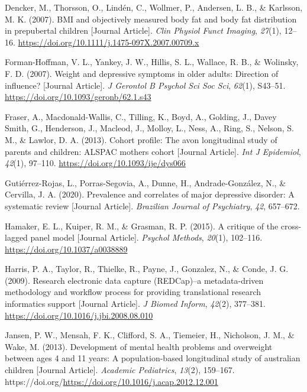 \documentclass[
  letterpaper,
  DIV=11,
  numbers=noendperiod]{scrreport}
\newlength{\cslhangindent}
\newenvironment{CSLReferences}[2] %
 {\begin{list}{}{%
  \setlength{\itemindent}{0pt}
  \setlength{\leftmargin}{0pt}
  \setlength{\parsep}{0pt}
  \ifodd #1
   \setlength{\leftmargin}{\cslhangindent}
   \setlength{\itemindent}{-1\cslhangindent}
  \fi
  \setlength{\itemsep}{#2\baselineskip}}}
 {\end{list}}
\begin{document}
\begin{CSLReferences}{1}{0}
Dencker, M., Thorsson, O., Lindén, C., Wollmer, P., Andersen, L. B., \&
Karlsson, M. K. (2007). BMI and objectively measured body fat and body
fat distribution in prepubertal children {[}Journal Article{]}.
\emph{Clin Physiol Funct Imaging}, \emph{27}(1), 12--16.
\url{https://doi.org/10.1111/j.1475-097X.2007.00709.x}

Forman-Hoffman, V. L., Yankey, J. W., Hillis, S. L., Wallace, R. B., \&
Wolinsky, F. D. (2007). Weight and depressive symptoms in older adults:
Direction of influence? {[}Journal Article{]}. \emph{J Gerontol B
Psychol Sci Soc Sci}, \emph{62}(1), S43--51.
\url{https://doi.org/10.1093/geronb/62.1.s43}

Fraser, A., Macdonald-Wallis, C., Tilling, K., Boyd, A., Golding, J.,
Davey Smith, G., Henderson, J., Macleod, J., Molloy, L., Ness, A., Ring,
S., Nelson, S. M., \& Lawlor, D. A. (2013). Cohort profile: The avon
longitudinal study of parents and children: ALSPAC mothers cohort
{[}Journal Article{]}. \emph{Int J Epidemiol}, \emph{42}(1), 97--110.
\url{https://doi.org/10.1093/ije/dys066}

Gutiérrez-Rojas, L., Porras-Segovia, A., Dunne, H., Andrade-González,
N., \& Cervilla, J. A. (2020). Prevalence and correlates of major
depressive disorder: A systematic review {[}Journal Article{]}.
\emph{Brazilian Journal of Psychiatry}, \emph{42}, 657--672.

Hamaker, E. L., Kuiper, R. M., \& Grasman, R. P. (2015). A critique of
the cross-lagged panel model {[}Journal Article{]}. \emph{Psychol
Methods}, \emph{20}(1), 102--116. \url{https://doi.org/10.1037/a0038889}

Harris, P. A., Taylor, R., Thielke, R., Payne, J., Gonzalez, N., \&
Conde, J. G. (2009). Research electronic data capture (REDCap)--a
metadata-driven methodology and workflow process for providing
translational research informatics support {[}Journal Article{]}.
\emph{J Biomed Inform}, \emph{42}(2), 377--381.
\url{https://doi.org/10.1016/j.jbi.2008.08.010}

Jansen, P. W., Mensah, F. K., Clifford, S. A., Tiemeier, H., Nicholson,
J. M., \& Wake, M. (2013). Development of mental health problems and
overweight between ages 4 and 11 years: A population-based longitudinal
study of australian children {[}Journal Article{]}. \emph{Academic
Pediatrics}, \emph{13}(2), 159--167.
https://doi.org/\url{https://doi.org/10.1016/j.acap.2012.12.001}


\end{CSLReferences}
\end{document}
